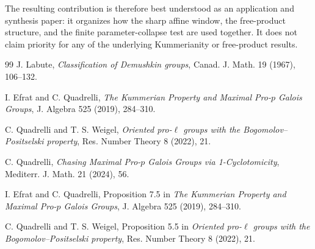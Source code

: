 \documentclass[11pt]{article}
\begin{document}
The resulting contribution is therefore best understood as an application and synthesis paper: it organizes how the sharp affine window, the free-product structure, and the finite parameter-collapse test are used together. It does not claim priority for any of the underlying Kummerianity or free-product results.

\begin{thebibliography}{99}
J. Labute, \emph{Classification of Demushkin groups}, Canad. J. Math. 19 (1967), 106--132.

I. Efrat and C. Quadrelli, \emph{The Kummerian Property and Maximal Pro-$p$ Galois Groups}, J. Algebra 525 (2019), 284--310.

C. Quadrelli and T. S. Weigel, \emph{Oriented pro-$\ell$ groups with the Bogomolov--Positselski property}, Res. Number Theory 8 (2022), 21.

C. Quadrelli, \emph{Chasing Maximal Pro-$p$ Galois Groups via 1-Cyclotomicity}, Mediterr. J. Math. 21 (2024), 56.

I. Efrat and C. Quadrelli, Proposition 7.5 in \emph{The Kummerian Property and Maximal Pro-$p$ Galois Groups}, J. Algebra 525 (2019), 284--310.

C. Quadrelli and T. S. Weigel, Proposition 5.5 in \emph{Oriented pro-$\ell$ groups with the Bogomolov--Positselski property}, Res. Number Theory 8 (2022), 21.

\end{thebibliography}
\end{document}
